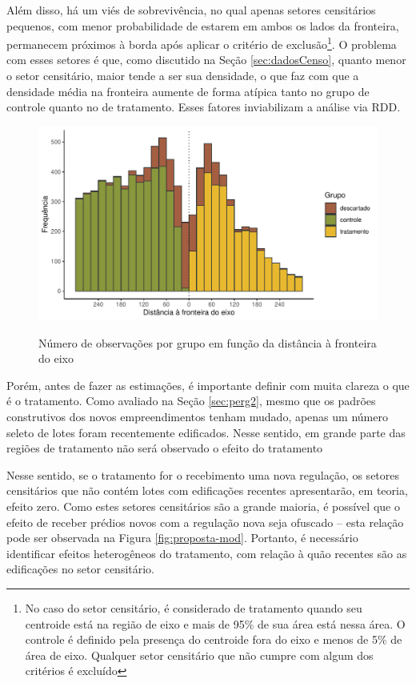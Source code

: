 Além disso, há um viés de sobrevivência, no qual apenas setores censitários pequenos, com menor probabilidade de estarem em ambos os lados da fronteira, permanecem próximos à borda após aplicar o critério de exclusão\footnote{No caso do setor censitário, é considerado de tratamento quando seu centroide está na região de eixo e mais de 95\% de sua área está nessa área. O controle é definido pela presença do centroide fora do eixo e menos de 5\% de área de eixo. Qualquer setor censitário que não cumpre com algum dos critérios é excluído}. O problema com esses setores é que, como discutido na Seção \ref{sec:dadosCenso}, quanto menor o setor censitário, maior tende a ser sua densidade, o que faz com que a densidade média na fronteira aumente de forma atípica tanto no grupo de controle quanto no de tratamento. Esses fatores inviabilizam a análise via RDD.

\begin{figure}[!h]
    \centering
    \caption{Número de observações por grupo em função da distância à fronteira do eixo}
    \includegraphics[width = .75\textwidth]{figuras/rdd-balanceamento-censo.pdf}
    \label{fig:rdd-densidade-censo}
\end{figure}

Porém, antes de fazer as estimações, é importante definir com muita clareza o que é o tratamento. Como avaliado na Seção \ref{sec:perg2}, mesmo que os padrões construtivos dos novos empreendimentos tenham mudado, apenas um número seleto de lotes foram recentemente edificados. Nesse sentido, em grande parte das regiões de tratamento não será observado o efeito do tratamento


Nesse sentido, se o tratamento for o recebimento uma nova regulação, os setores censitários que não contém lotes com edificações recentes apresentarão, em teoria, efeito zero. Como estes setores censitários são a grande maioria, é possível que o efeito de receber prédios novos com a regulação nova seja ofuscado -- esta relação pode ser observada na Figura \ref{fig:proposta-mod}. Portanto, é necessário identificar efeitos heterogêneos do tratamento, com relação à quão recentes são as edificações no setor censitário.

